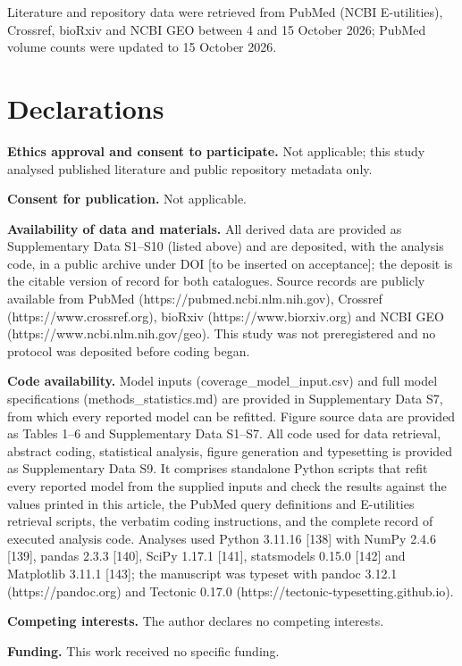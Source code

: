 \documentclass{article}
\begin{document}
Literature and repository data were retrieved from PubMed (NCBI
E-utilities), Crossref, bioRxiv and NCBI GEO between 4 and 15 October
2026; PubMed volume counts were updated to 15 October 2026.

\section{Declarations}\label{declarations}

\textbf{Ethics approval and consent to participate.} Not applicable;
this study analysed published literature and public repository metadata
only.

\textbf{Consent for publication.} Not applicable.

\textbf{Availability of data and materials.} All derived data are
provided as Supplementary Data S1--S10 (listed above) and are deposited,
with the analysis code, in a public archive under DOI {[}to be inserted
on acceptance{]}; the deposit is the citable version of record for both
catalogues. Source records are publicly available from PubMed
(https://pubmed.ncbi.nlm.nih.gov), Crossref (https://www.crossref.org),
bioRxiv (https://www.biorxiv.org) and NCBI GEO
(https://www.ncbi.nlm.nih.gov/geo). This study was not preregistered and
no protocol was deposited before coding began.

\textbf{Code availability.} Model inputs (coverage\_model\_input.csv)
and full model specifications (methods\_statistics.md) are provided in
Supplementary Data S7, from which every reported model can be refitted.
Figure source data are provided as Tables 1--6 and Supplementary Data
S1--S7. All code used for data retrieval, abstract coding, statistical
analysis, figure generation and typesetting is provided as Supplementary
Data S9. It comprises standalone Python scripts that refit every
reported model from the supplied inputs and check the results against
the values printed in this article, the PubMed query definitions and
E-utilities retrieval scripts, the verbatim coding instructions, and the
complete record of executed analysis code. Analyses used Python 3.11.16
{[}138{]} with NumPy 2.4.6 {[}139{]}, pandas 2.3.3 {[}140{]}, SciPy
1.17.1 {[}141{]}, statsmodels 0.15.0 {[}142{]} and Matplotlib 3.11.1
{[}143{]}; the manuscript was typeset with pandoc 3.12.1
(https://pandoc.org) and Tectonic 0.17.0
(https://tectonic-typesetting.github.io).

\textbf{Competing interests.} The author declares no competing
interests.

\textbf{Funding.} This work received no specific funding.
\end{document}

